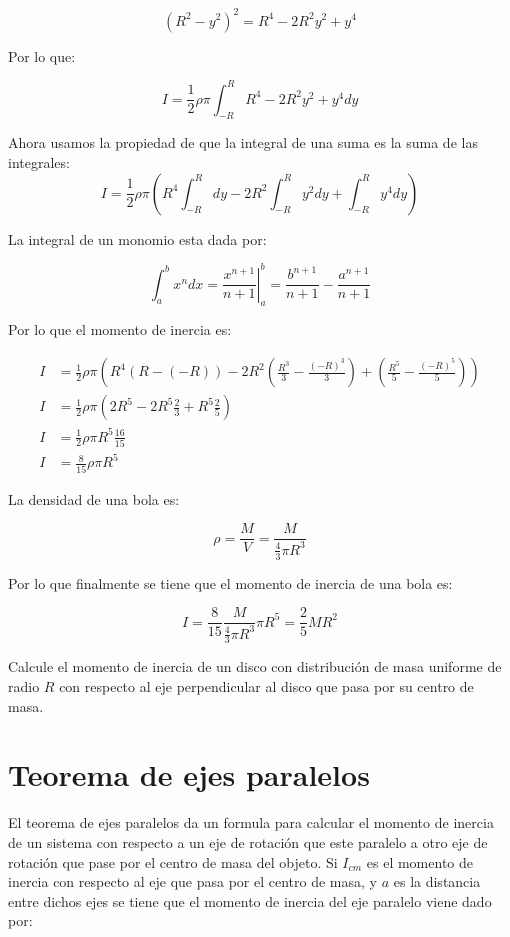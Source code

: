\documentclass[a4paper,11pt]{article}
\theoremstyle{mytheor}
\begin{document}
$$ (R^2-y^2)^2 = R^4 -2 R^2 y^2 + y^4$$

Por lo que:


$$ I = \frac{1}{2} \rho \pi \int_{-R}^{R}  R^4 -2 R^2 y^2 + y^4   dy$$

Ahora usamos la propiedad de que la integral de una suma es la suma de las integrales:
$$ I = \frac{1}{2} \rho \pi \left(  R^4\int_{-R}^{R} dy -2 R^2 \int_{-R}^{R} y^2 dy + \int_{-R}^{R}y^4   dy\right)$$

La integral de un monomio esta dada por:

$$ \int_{a}^{b} x^{n} dx = \left.\frac{x^{n+1}}{n+1}\right|_{a}^{b} = \frac{b^{n+1}}{n+1} - \frac{a^{n+1}}{n+1}$$


Por lo que el momento de inercia es:


\begin{align*}
I &= \frac{1}{2} \rho \pi \left(  R^4(R-(-R))  -2 R^2 \left( \frac{R^3}{3}-\frac{(-R)^3}{3}\right)  + \left( \frac{R^5}{5}-\frac{(-R)^5}{5}\right)\right) \\
I  &=\frac{1}{2} \rho \pi \left(  2R^5 -2 R^5 \frac{2}{3}  + R^5 \frac{2}{5}\right)\\
I & = \frac{1}{2} \rho \pi R^5 \frac{16}{15}\\
I & = \frac{8}{15} \rho \pi R^5
\end{align*} 

La densidad de una bola es:

$$ \rho = \frac{M}{V} = \frac{M}{
	\frac{4}{3} \pi R^3}$$

Por lo que finalmente se tiene que el momento de inercia de una bola es:

$$ I= \frac{8}{15} \frac{M}{
	\frac{4}{3} \pi R^3} \pi R^5 =  \frac{2}{5} M R^2$$


Calcule el momento de inercia de un disco con distribución de masa uniforme de radio $R$ con respecto al eje perpendicular al disco que pasa por su centro de masa. 




\section{Teorema de ejes paralelos}

El teorema de ejes paralelos da un formula para calcular el momento de inercia de un sistema con respecto a un eje de rotación que este paralelo a otro eje de rotación que pase por el centro de masa del objeto. Si $I_{cm}$ es el momento de inercia con respecto al eje que pasa por el centro de masa, y $a$ es la distancia entre dichos ejes se tiene que el momento de inercia del eje paralelo viene dado por:
\end{document}
